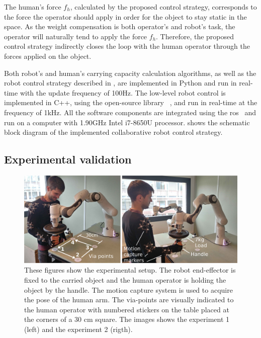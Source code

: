 The human's force $f_h$, calculated by the proposed control strategy, corresponds to the force the operator should apply in order for the object to stay static in the space. As the weight compensation is both operator's and robot's task, the operator will naturally tend to apply the force $f_h$. 
Therefore, the proposed control strategy indirectly closes the loop with the human operator through the forces applied on the object.

Both robot's and human's carrying capacity calculation algorithms, as well as the robot control strategy described in , are implemented in Python and run in real-time with the update frequency of 100Hz. The low-level robot control is implemented in C++, using the open-source library ~\cite{pinocchio2021}, and run in real-time at the frequency of 1kHz. All the software components are integrated using the \gls{ros}~\cite{ros} and run on a computer with 1.90GHz Intel i7-8650U processor. 
 shows the schematic block diagram of the implemented collaborative robot control strategy. 

\subsection{Experimental validation}
\label{sec:human_robot_experiment}

\begin{figure}[!h]
    \centering
    \includegraphics[width=\linewidth]{Papers/images/both_pose_explanation.jpg}
    \caption{{These figures show the experimental setup. The robot end-effector is fixed to the carried object and the human operator is holding the object by the handle. The motion capture system is used to acquire the pose of the human arm. The via-points are visually indicated to the human operator with numbered stickers on the table placed at the corners of a 30 cm square. The images shows the experiment 1 (left) and the experiment 2 (rigth).}}
    \label{fig:experiment2}
\end{figure}

